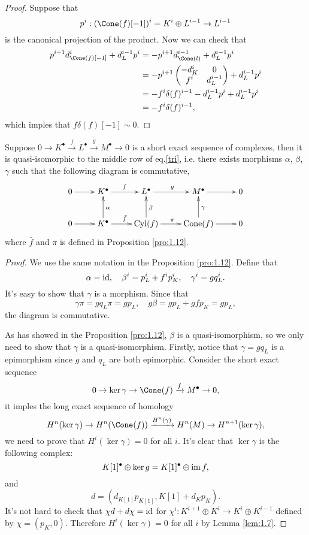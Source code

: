 \begin{proof}
	Suppose that 
	\[
		p^i:(\Cone(f)[-1])^i=K^i\oplus L^{i-1}\to L^{i-1}
	\]
	is the canonical projection of the product. Now we can check that 
	\[
		\begin{aligned}
			p^{i+1}d^i_{\Cone(f)[-1]}+d^{i-1}_{L}p^i
			&=-p^{i+1}d^{i-1}_{\Cone(l)}+d^{i-1}_{L}p^i\\
			&=-p^{i+1}\begin{pmatrix}
				-d^{i}_{K}&0\\
				f^i&d_{L}^{i-1}
			\end{pmatrix}+d^{i-1}_{L}p^i\\
			&=-f^i\delta(f)^{i-1}-d_{L}^{i-1}p^i+d^{i-1}_{L}p^i\\
			&=-f^i\delta(f)^{i-1},
		\end{aligned}
	\]
	which imples that $f\delta(f)[-1] \sim 0$.
\end{proof}

\begin{pro}\label{pro:1.13}
	Suppose $0\to K^\bullet \xrightarrow{f}L^\bullet \xrightarrow{g}M^\bullet\to 0$ is a short exact sequence of complexes, then it is quasi-isomorphic to the middle row of eq.\eqref{tri}, i.e. there exists morphisms $\alpha$, $\beta$, $\gamma$ such that the following diagram
	is commutative,
	\[
		\xymatrix{
		0 \ar@{->}[r] & K^\bullet \ar@{->}[r]^{f} & L^\bullet \ar@{->}[r]^{g} & M^\bullet \ar@{->}[r] & 0 \\
		0 \ar@{->}[r] & K^\bullet \ar@{->}[r]^{\bar f} \ar@{->}[u]_{\alpha} & \operatorname{Cyl}(f) \ar@{->}[r]^{\pi} \ar@{->}[u]_{\beta} & \operatorname{Cone}(f) \ar@{->}[r] \ar@{->}[u]_{\gamma} & 0
		}
	\]
	where $\bar f$ and $\pi$ is defined in Proposition \ref{pro:1.12}.
\end{pro}

\begin{proof}
	We use the same notation in the Proposition \ref{pro:1.12}. Define that
	\[
		\alpha=\operatorname{id},\quad \beta^i= p^i_{L} + f^i p^i_K,\quad \gamma^i=gq_L^i.
	\]
	It's easy to show that $\gamma$ is a morphism. Since that 
	\[
		\gamma\pi=gq_L\pi=gp_L,\quad g\beta=gp_L+gfp_K=gp_L,
	\]
	the diagram is commutative.

	As has showed in the Proposition \ref{pro:1.12}, $\beta$ is a quasi-isomorphism, so we only need to show that $\gamma$ is a quasi-isomorphism. Firstly, notice that $\gamma=gq_L$ is a epimorphism since $g$ and $q_L$ are both epimorphic. Consider the short exact sequence
	\[
		0\to \ker \gamma\to \Cone(f)\xrightarrow{f} M^\bullet\to 0,
	\]
	it imples the long exact sequence of homology
	\[
		H^n(\ker \gamma)\to H^n(\Cone(f))\xrightarrow{H^n(\gamma)}H^n(M)\to H^{n+1}(\ker \gamma),
	\]
	we need to prove that $H^i(\ker \gamma)=0$ for all $i$. It's clear that $\ker \gamma$ is the following complex:
	\[
		K[1]^\bullet \oplus \ker g=K[1]^\bullet \oplus \operatorname{im} f,
	\]
	and 
	\[
		d=(d_{K[1]}p_{K[1]},K[1]+d_{K}p_K).
	\]
	It's not hard to check that $\chi d+d \chi =\operatorname{id}$ for $\chi^i:K^{i+1}\oplus K^i\to K^i\oplus K^{i-1}$ defined by $\chi=(p_K,0)$. Therefore $H^i(\ker \gamma)=0$ for all $i$ by Lemma \ref{lem:1.7}.
\end{proof}


